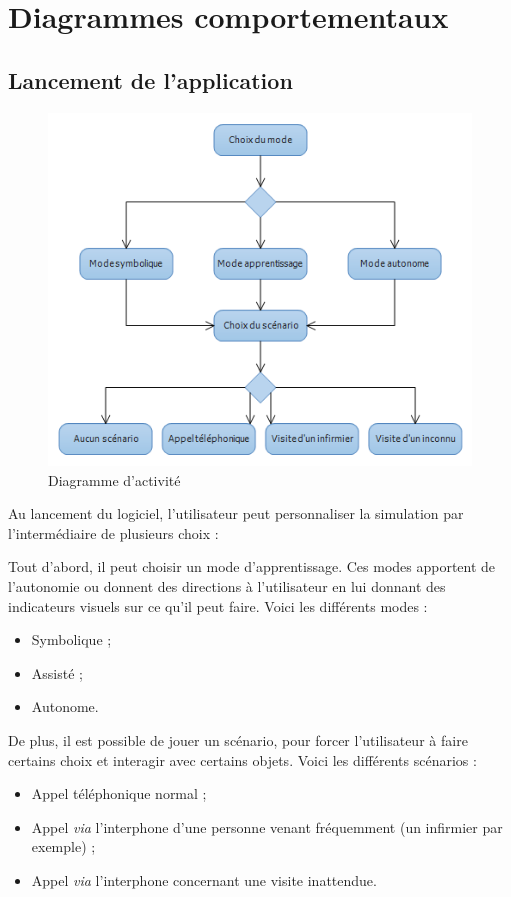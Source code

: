 \section{Diagrammes comportementaux}

\subsection{Lancement de l'application}
\begin{figure}[h]
\centering
\includegraphics[width=1\textwidth]{4-conception/img/diagActivite.png}
\caption{ Diagramme d'activité}
\end{figure}

Au lancement du logiciel, l'utilisateur peut personnaliser la simulation par l'intermédiaire de plusieurs choix :

Tout d'abord, il peut choisir un mode d'apprentissage. Ces modes apportent de l'autonomie ou donnent des directions à l'utilisateur en lui donnant des indicateurs visuels sur ce qu'il peut faire. Voici les différents modes :
\begin{itemize}
\item Symbolique ;
\item Assisté ;
\item Autonome.
\end{itemize}
\vspace{0.5cm}

De plus, il est possible de jouer un scénario, pour forcer l'utilisateur à faire certains choix et interagir avec certains objets. Voici les différents scénarios :
\begin{itemize}
\item Appel téléphonique normal ;
\item Appel \textit{via} l'interphone d'une personne venant fréquemment (un infirmier par exemple) ;
\item Appel \textit{via} l'interphone concernant une visite inattendue.
\end{itemize}
\vspace{0.5cm}

